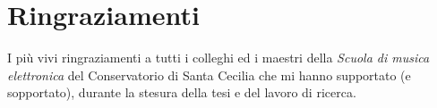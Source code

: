 
\chapter*{Ringraziamenti}


I più vivi ringraziamenti a tutti i colleghi ed i maestri della \textit{Scuola di musica elettronica} del Conservatorio di Santa Cecilia che mi hanno supportato (e sopportato), durante la stesura della tesi e del lavoro di ricerca. \\

